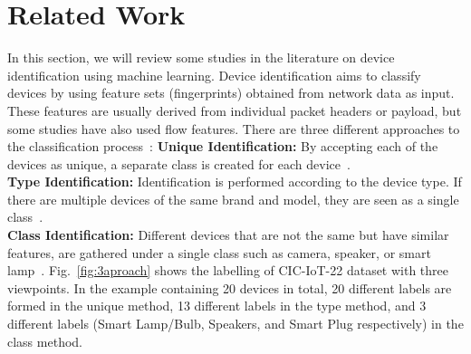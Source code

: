 \documentclass[journal]{IEEEtran}
\begin{document}
\section{Related Work}

In this section, we will review some studies in the literature on device identification using machine learning. Device identification aims to classify devices by using feature sets (fingerprints) obtained from network data as input.  These features are usually derived from individual packet headers or payload, but some studies have also used flow features. There are three different approaches to the classification process~\cite{yadav2020position}:
\textbf{Unique Identification:} By accepting each of the devices as unique, a separate class is created for each device~\cite{hamad2019iot}.\\
\textbf{Type Identification:}  Identification is performed according to the device type. If there are multiple devices of the same brand and model, they are seen as a single class~\cite{miettinen2017iot}.\\
\textbf{Class Identification:}  Different devices that are not the same but have similar features, are gathered under a single class such as camera, speaker, or smart lamp~\cite{CIC}. Fig.~\ref{fig:3aproach} shows the labelling of CIC-IoT-22 dataset with three viewpoints. In the example containing 20 devices in total, 20 different labels are formed in the unique method, 13 different labels in the type method, and 3 different labels (Smart Lamp/Bulb, Speakers, and Smart Plug respectively) in the class method. 
\end{document}

